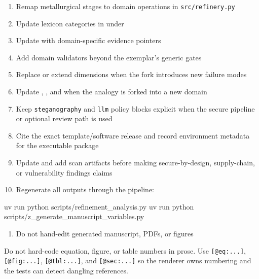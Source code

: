 \documentclass[
]{article}
\newenvironment{Shaded}{}{}
\newcommand{\ExtensionTok}[1]{#1}
\newcommand{\NormalTok}[1]{#1}
\providecommand{\tightlist}{%
  \setlength{\itemsep}{0pt}\setlength{\parskip}{0pt}}
\begin{document}
\begin{enumerate}
\def\labelenumi{\arabic{enumi}.}
\tightlist
\item
  Remap metallurgical stages to domain operations in
  \texttt{src/refinery.py}
\item
  Update lexicon categories in  under
\item
  Update  with domain-specific evidence
  pointers
\item
  Add domain validators beyond the exemplar's generic gates
\item
  Replace or extend  dimensions when the fork
  introduces new failure modes
\item
  Update , ,
  and  when the analogy is forked
  into a new domain
\item
  Keep \texttt{steganography} and \texttt{llm} policy blocks explicit
  when the secure pipeline or optional review path is used
\item
  Cite the exact template/software release and record environment
  metadata for the executable package
\item
  Update  and add scan
  artifacts before making secure-by-design, supply-chain, or
  vulnerability findings claims
\item
  Regenerate all outputs through the pipeline:
\end{enumerate}

\begin{Shaded}
\begin{Highlighting}[]
\ExtensionTok{uv}\NormalTok{ run python scripts/refinement\_analysis.py}
\ExtensionTok{uv}\NormalTok{ run python scripts/z\_generate\_manuscript\_variables.py}
\end{Highlighting}
\end{Shaded}

\begin{enumerate}
\def\labelenumi{\arabic{enumi}.}
\setcounter{enumi}{10}
\tightlist
\item
  Do not hand-edit generated manuscript, PDFs, or figures
\end{enumerate}

Do not hard-code equation, figure, or table numbers in prose. Use
\texttt{{[}@eq:...{]}}, \texttt{{[}@fig:...{]}},
\texttt{{[}@tbl:...{]}}, and \texttt{{[}@sec:...{]}} so the renderer
owns numbering and the tests can detect dangling references.
\end{document}
